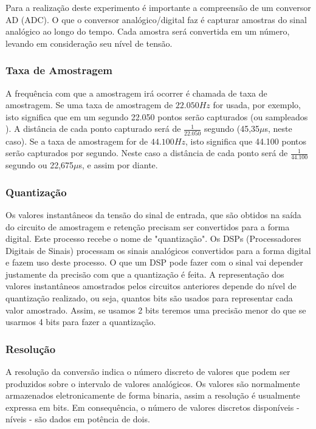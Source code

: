 Para a realização deste experimento é importante a compreensão de um conversor AD (ADC). O que o conversor analógico/digital faz é capturar amostras do sinal analógico ao longo do tempo.
Cada amostra será convertida em um número, levando em consideração seu nível de tensão. 

\subsubsection{Taxa de Amostragem}\label{tax}

A frequência com que a amostragem irá ocorrer é chamada de taxa de amostragem. Se uma taxa de
amostragem de $22.050 Hz$ for usada, por exemplo, isto significa que em um segundo 22.050 pontos
serão capturados (ou sampleados ). A distância de cada ponto capturado será de $\frac{1}{22.050}$ segundo
(45,35$\mu$s, neste caso). Se a taxa de amostragem for de $44.100 Hz$, isto significa que 44.100 pontos
serão capturados por segundo. Neste caso a distância de cada ponto será de $\frac{1}{44.100}$ segundo ou
22,675$\mu$s, e assim por diante.\cite{cdh}

\subsubsection{Quantização}\label{quant}
Os valores instantâneos da tensão do sinal de entrada, que são obtidos na saída do circuito de amostragem e retenção precisam ser convertidos para a forma digital. Este processo recebe o nome de "quantização".
Os DSPs (Processadores Digitais de Sinais) processam os sinais analógicos convertidos para a forma digital e fazem uso deste processo.
O  que um DSP pode fazer com o sinal vai depender justamente da precisão com que a quantização é feita.
A representação dos valores instantâneos amostrados pelos circuitos anteriores depende do nível de quantização realizado, ou seja, quantos bits são usados para representar cada valor amostrado.
Assim, se usamos 2 bits teremos uma precisão menor do que se usarmos 4 bits para fazer a quantização.

\subsubsection{Resolução}\label{resolucao}

A resolução da conversão indica o número discreto de valores que podem ser produzidos sobre o intervalo de valores analógicos. Os valores são normalmente armazenados eletronicamente de forma binaria, assim a resolução é usualmente expressa em bits. Em consequência, o número de valores discretos disponíveis - níveis - são dados em potência de dois.

